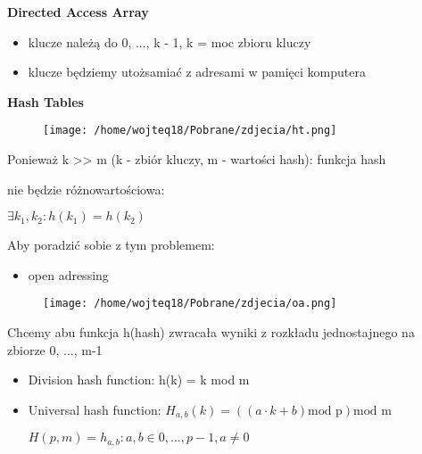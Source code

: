 \documentclass{article}
\begin{document}
    \newpage
    \textbf{Directed Access Array} \par
    \begin{itemize}
        \item klucze należą do {0, ..., k - 1}, k = moc zbioru kluczy
        \item klucze będziemy utożsamiać z adresami w pamięci komputera
    \end{itemize}
    \vspace{1\baselineskip}
    \textbf{Hash Tables} \par
    \vspace{1\baselineskip}
    \begin{figure}[H]
        \centering
        \texttt{[image: /home/wojteq18/Pobrane/zdjecia/ht.png]}
        \label{fig:example_image}
    \end{figure} \par
    Ponieważ k >> m (k - zbiór kluczy, m - wartości hash): funkcja hash  \par nie będzie różnowartościowa:
    \begin{center}
        $\exists k_1, k_2: h(k_1) = h(k_2)$
    \end{center}
    \vspace{1\baselineskip}
    Aby poradzić sobie z tym problemem:
    \begin{itemize}
        \item open adressing
    \end{itemize}
    \begin{figure}[H]
        \centering
        \texttt{[image: /home/wojteq18/Pobrane/zdjecia/oa.png]}
        \label{fig:example_image}
    \end{figure} \par
    Chcemy abu funkcja h(hash) zwracała wyniki z rozkładu jednostajnego na zbiorze {0, ..., m-1}
    \begin{itemize}
        \item Division hash function: h(k) = k mod m
        \item Universal hash function: $H_{a,b}(k) = ((a \cdot k + b)\text{mod p}) \text{mod m}$
            \begin{center}
                $H(p, m) = {h_{a,b}: a, b \in {0, ..., p-1}, a \neq 0}$
            \end{center}
    \end{itemize}
\end{document}
